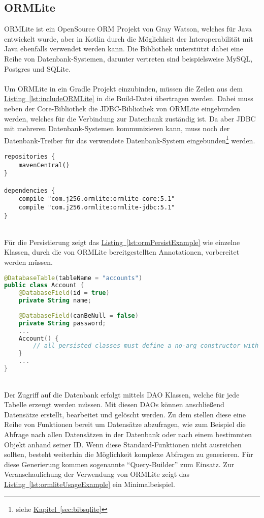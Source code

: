 \subsection{ORMLite}\label{sec:bibormlite}
ORMLite ist ein OpenSource \gls{ORM} Projekt von Gray Watson, welches für Java entwickelt wurde, aber in Kotlin durch die Möglichkeit der Interoperabilität mit Java ebenfalls verwendet werden kann. Die Bibliothek unterstützt dabei eine Reihe von Datenbank-Systemen, darunter vertreten sind beispielsweise MySQL, Postgres und SQLite.\\
\\
Um ORMLite in ein Gradle Projekt einzubinden, müssen die Zeilen aus dem \hyperref[lst:includeORMLite]{Listing~\ref{lst:includeORMLite}} in die Build-Datei übertragen werden. Dabei muss neben der Core-Bibliothek die \gls{JDBC}-Bibliothek von ORMLite eingebunden werden, welches für die Verbindung zur Datenbank zuständig ist. Da aber \gls{JDBC} mit mehreren Datenbank-Systemen kommunizieren kann, muss noch der Datenbank-Treiber für das verwendete Datenbank-System eingebunden\footnote{siehe \hyperref[sec:bibsqlite]{Kapitel~\ref{sec:bibsqlite}}} werden.
\\
\begin{lstlisting}[style=lstStyleFramed, language=Gradle, caption={Einbindung der Bibliothek ORMLite mittels Gradle}, label=lst:includeORMLite, float]
repositories {
	mavenCentral()
}

dependencies {
	compile "com.j256.ormlite:ormlite-core:5.1"
	compile "com.j256.ormlite:ormlite-jdbc:5.1"
}
\end{lstlisting}
\\
Für die Persistierung zeigt das \hyperref[lst:ormPersistExample]{Listing~\ref{lst:ormPersistExample}} wie einzelne Klassen, durch die von ORMLite bereitgestellten Annotationen, vorbereitet werden müssen.
\\
\begin{lstlisting}[style=lstStyleFramed, language=Kotlin, caption={Beispiel: Persistierung einer Klasse mittels ORMLite \cite{ormlite}},label=lst:ormPersistExample, float]
@DatabaseTable(tableName = "accounts")
public class Account {
	@DatabaseField(id = true)
	private String name;
	
	@DatabaseField(canBeNull = false)
	private String password;
	...
	Account() {
		// all persisted classes must define a no-arg constructor with at least package visibility
	}
	...    
}
\end{lstlisting}
\\
Der Zugriff auf die Datenbank erfolgt mittels \gls{DAO} Klassen, welche für jede Tabelle erzeugt werden müssen. Mit diesen \glspl{DAO} können anschließend Datensätze erstellt, bearbeitet und gelöscht werden. Zu dem stellen diese eine Reihe von Funktionen bereit um Datensätze abzufragen, wie zum Beispiel die Abfrage nach allen Datensätzen in der Datenbank oder nach einem bestimmten Objekt anhand seiner ID. Wenn diese Standard-Funktionen nicht ausreichen sollten, besteht weiterhin die Möglichkeit komplexe Abfragen zu generieren. Für diese Generierung kommen sogenannte \enquote{Query-Builder} zum Einsatz. Zur Veranschaulichung der Verwendung von ORMLite zeigt das \hyperref[lst:ormliteUsageExample]{Listing~\ref{lst:ormliteUsageExample}} ein Minimalbeispiel.
